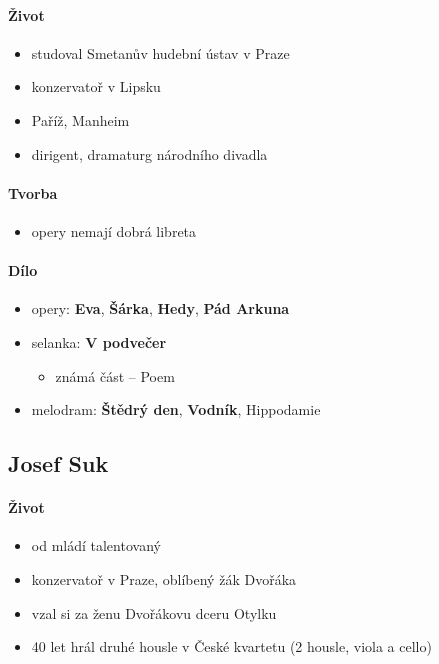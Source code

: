 \paragraph{Život}
\begin{itemize}
\item studoval Smetanův hudební ústav v Praze
\item konzervatoř v Lipsku
\item Paříž, Manheim
\item dirigent, dramaturg národního divadla
\end{itemize}

\paragraph{Tvorba}
\begin{itemize}
\item opery nemají dobrá libreta
\end{itemize}

\paragraph{Dílo}
\begin{itemize}
\item opery: \textbf{Eva}, \textbf{Šárka}, \textbf{Hedy}, \textbf{Pád Arkuna}
\item selanka: \textbf{V podvečer}
	\begin{itemize}
	\item známá část -- Poem
	\end{itemize}
\item melodram: \textbf{Štědrý den}, \textbf{Vodník}, Hippodamie
\end{itemize}

\subsection{Josef Suk}
\paragraph{Život}
\begin{itemize}
\item od mládí talentovaný
\item konzervatoř v Praze, oblíbený žák Dvořáka
\item vzal si za ženu Dvořákovu dceru Otylku
\item 40 let hrál druhé housle v České kvartetu (2 housle, viola a cello)
\end{itemize}

